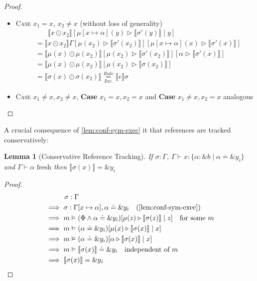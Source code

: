 \documentclass[twoside, english]{sdqthesis}
\newcommand{\bbracket}[1]{\llbracket #1 \rrbracket}
\newcommand{\tr}[0]{\triangleright}
\newtheorem{lemma}[theorem]{Lemma}
\theoremstyle{definition}
\begin{document}
\begin{proof}
\begin{itemize}
\begin{itemize}
\begin{itemize}
              \begin{itemize}
                \item \textsc{Case $x_1=x$, $x_2 \neq x$} (without loss of generality)
                \begin{align*}
                  &\phantom{=}\ \ \bbracket{x \odot x_2}[\mu[x\mapsto \alpha](y) \tr \bbracket{\sigma'(y)} \mid y]
                  \\ &=\bbracket{x \odot x_2}\Gamma[\mu(x_2)\tr \bbracket{\sigma'(x_2)}][\mu[x \mapsto \alpha](x) \tr \bbracket{\sigma'(x)}]
                  \\ &=\bbracket{\mu(x) \odot \mu(x_2)}[\mu(x_2)\tr \bbracket{\sigma'(x_2)}][\alpha \tr \bbracket{\sigma'(x)}]
                  \\ &=\bbracket{\mu(x) \odot \mu(x_2)}[\mu(x_2)\tr \bbracket{\sigma(x_2)}]
                  \\ &=\bbracket{\sigma(x) \odot \sigma(x_2)} \underset{Inv.}{\overset{Rule}{=}} \bbracket{e}\sigma
                \end{align*}
                \item \textsc{Case} $x_1\neq x, x_2 \neq x$, \textbf{Case} $x_1 = x, x_2 = x$ and \textbf{Case} $x_1 \neq x, x_2 = x$ analogous
              \end{itemize}
          \end{itemize}
      \end{itemize}
  \end{itemize}
\end{proof}

A crucial consequence of \cref{lem:conf-sym-exec} it that references are tracked conservatively:
\begin{lemma}[Conservative Reference Tracking]\label{lem:conservative-ref-tracking}
 If $\sigma : \Gamma$, $\Gamma \vdash x : \{ \alpha : \&b \mid \alpha \doteq \&y_i \}$ and $ \Gamma \vdash \alpha \text{ fresh}  $ then $\bbracket{\sigma(x)} = \&y_i$
\end{lemma}

\begin{proof}
  \begin{align*}
    &\phantom{\implies}\ \ \sigma : \Gamma 
    \\ &\implies \sigma : \Gamma[x \mapsto \alpha], \alpha \doteq \&y_i \quad (\cref{lem:conf-sym-exec})
    \\ &\implies m \vDash (\Phi \wedge \alpha \doteq \&y_i)[\mu(z) \tr \bbracket{\sigma(z)} \mid z] \quad \text{for some }m
    \\ &\implies m \vDash (\alpha \doteq \&y_i)[\mu(x) \tr \bbracket{\sigma(x)} \mid x]
    \\ &\implies m \vDash (\alpha \doteq \&y_i)[\alpha \tr \bbracket{\sigma(x)} \mid x]
    \\ &\implies m \vDash \bbracket{\sigma(x)} \doteq \&y_i \quad \text{independent of $m$}
    \\ &\implies  \bbracket{\sigma(x)} = \&y_i
  \end{align*}
\end{proof}
\end{document}

